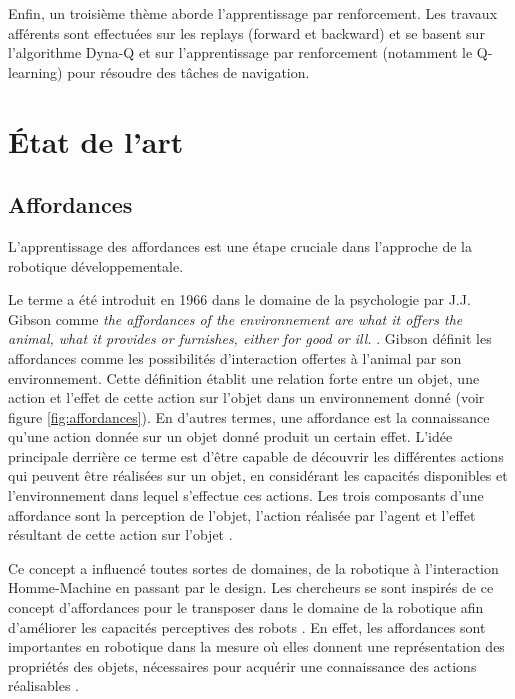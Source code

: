 \documentclass{llncs}
\begin{document}
Enfin, un troisième thème aborde l'apprentissage par renforcement.
Les travaux afférents sont effectuées sur les replays (forward et backward) et se basent sur l'algorithme Dyna-Q et sur l'apprentissage par renforcement (notamment le Q-learning) pour résoudre des tâches de navigation.


\section{\'Etat de l'art}

\subsection{Affordances}

L'apprentissage des affordances est une étape cruciale dans l'approche de la robotique développementale.

Le terme a été introduit en 1966 dans le domaine de la psychologie par J.J. Gibson comme \textit{the affordances of the environnement are what it offers the animal, what it provides or furnishes, either for good or ill.} \cite{opac-b1085639}.
Gibson définit les affordances comme les possibilités d'interaction offertes à l'animal par son environnement.
Cette définition établit une relation forte entre un objet, une action et l'effet de cette action sur l'objet dans un environnement donné (voir figure \ref{fig:affordances}).
En d'autres termes, une affordance est la connaissance qu'une action donnée sur un objet donné produit un certain effet.
L'idée principale derrière ce terme est d'être capable de découvrir les différentes actions qui peuvent être réalisées sur un objet, en considérant les capacités disponibles et l'environnement dans lequel s'effectue ces actions.
Les trois composants d'une affordance sont la perception de l'objet, l'action réalisée par l'agent et l'effet résultant de cette action sur l'objet \cite{Sahin2007}.

Ce concept a influencé toutes sortes de domaines, de la robotique à l'interaction Homme-Machine en passant par le design.
Les chercheurs se sont inspirés de ce concept d'affordances pour le transposer dans le domaine de la robotique afin d'améliorer les capacités perceptives des robots \cite{Jamone2016}.
En effet, les affordances sont importantes en robotique dans la mesure où elles donnent une représentation des propriétés des objets, nécessaires pour acquérir une connaissance des actions réalisables \cite{Montesano2008}.
\end{document}
